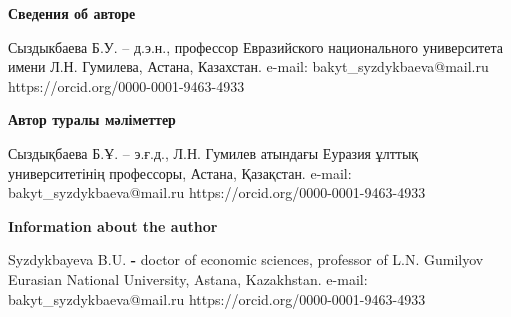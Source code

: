 \begin{authorinfo}
{\bfseries Сведения об авторе}

Сыздыкбаева Б.У. -- д.э.н., профессор Евразийского национального
университета имени Л.Н. Гумилева, Астана, Казахстан. e-mail:
bakyt\_syzdykbaeva@mail.ru https://orcid.org/0000-0001-9463-4933

{\bfseries Автор туралы мәліметтер}

Сыздықбаева Б.Ұ. -- э.ғ.д., Л.Н. Гумилев атындағы Еуразия ұлттық
университетінің профессоры, Астана, Қазақстан. e-mail:
bakyt\_syzdykbaeva@mail.ru https://orcid.org/0000-0001-9463-4933

{\bfseries Information about the author}

Syzdykbayeva B.U. {\bfseries -} doctor of economic sciences, professor of
L.N. Gumilyov Eurasian National University, Astana, Kazakhstan. e-mail:
bakyt\_syzdykbaeva@mail.ru https://orcid.org/0000-0001-9463-4933
\end{authorinfo}
